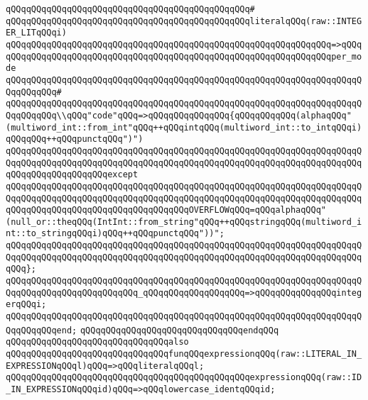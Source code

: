 \verb|qQQqqQQqqQQqqQQqqQQqqQQqqQQqqQQqqQQqqQQqqQQqqQQq#|\newline
\verb|qQQqqQQqqQQqqQQqqQQqqQQqqQQqqQQqqQQqqQQqqQQqqQQqliteralqQQq(raw::INTEGER_LITqQQqi)|\newline
\verb|qQQqqQQqqQQqqQQqqQQqqQQqqQQqqQQqqQQqqQQqqQQqqQQqqQQqqQQqqQQqqQQq=>qQQq|\newline
\verb|qQQqqQQqqQQqqQQqqQQqqQQqqQQqqQQqqQQqqQQqqQQqqQQqqQQqqQQqqQQqqQQqper_mode|\newline
\verb|qQQqqQQqqQQqqQQqqQQqqQQqqQQqqQQqqQQqqQQqqQQqqQQqqQQqqQQqqQQqqQQqqQQqqQQqqQQqqQQq#|\newline
\verb|qQQqqQQqqQQqqQQqqQQqqQQqqQQqqQQqqQQqqQQqqQQqqQQqqQQqqQQqqQQqqQQqqQQqqQQqqQQqqQQq\\qQQq"code"qQQq=>qQQqqQQqqQQqqQQq{qQQqqQQqqQQq(alphaqQQq"(multiword_int::from_int"qQQq++qQQqintqQQq(multiword_int::to_intqQQqi)qQQqqQQq++qQQqpunctqQQq")")|\newline
\verb|qQQqqQQqqQQqqQQqqQQqqQQqqQQqqQQqqQQqqQQqqQQqqQQqqQQqqQQqqQQqqQQqqQQqqQQqqQQqqQQqqQQqqQQqqQQqqQQqqQQqqQQqqQQqqQQqqQQqqQQqqQQqqQQqqQQqqQQqqQQqqQQqqQQqqQQqqQQqqQQqexcept|\newline
\verb|qQQqqQQqqQQqqQQqqQQqqQQqqQQqqQQqqQQqqQQqqQQqqQQqqQQqqQQqqQQqqQQqqQQqqQQqqQQqqQQqqQQqqQQqqQQqqQQqqQQqqQQqqQQqqQQqqQQqqQQqqQQqqQQqqQQqqQQqqQQqqQQqqQQqqQQqqQQqqQQqqQQqqQQqqQQqqQQqOVERFLOWqQQq=qQQqalphaqQQq"(null_or::theqQQq(IntInt::from_string"qQQq++qQQqstringqQQq(multiword_int::to_stringqQQqi)qQQq++qQQqpunctqQQq"))";|\newline
\verb|qQQqqQQqqQQqqQQqqQQqqQQqqQQqqQQqqQQqqQQqqQQqqQQqqQQqqQQqqQQqqQQqqQQqqQQqqQQqqQQqqQQqqQQqqQQqqQQqqQQqqQQqqQQqqQQqqQQqqQQqqQQqqQQqqQQqqQQqqQQqqQQq};|\newline
\newline
\verb|qQQqqQQqqQQqqQQqqQQqqQQqqQQqqQQqqQQqqQQqqQQqqQQqqQQqqQQqqQQqqQQqqQQqqQQqqQQqqQQqqQQqqQQqqQQqqQQq_qQQqqQQqqQQqqQQqqQQq=>qQQqqQQqqQQqqQQqintegerqQQqi;|\newline
\verb|qQQqqQQqqQQqqQQqqQQqqQQqqQQqqQQqqQQqqQQqqQQqqQQqqQQqqQQqqQQqqQQqqQQqqQQqqQQqqQQqend;|\newline
\verb|qQQqqQQqqQQqqQQqqQQqqQQqqQQqqQQqendqQQq|\newline
\newline
\verb|qQQqqQQqqQQqqQQqqQQqqQQqqQQqqQQqalso|\newline
\verb|qQQqqQQqqQQqqQQqqQQqqQQqqQQqqQQqfunqQQqexpressionqQQq(raw::LITERAL_IN_EXPRESSIONqQQql)qQQq=>qQQqliteralqQQql;|\newline
\verb|qQQqqQQqqQQqqQQqqQQqqQQqqQQqqQQqqQQqqQQqqQQqqQQqexpressionqQQq(raw::ID_IN_EXPRESSIONqQQqid)qQQq=>qQQqlowercase_identqQQqid;|\newline
